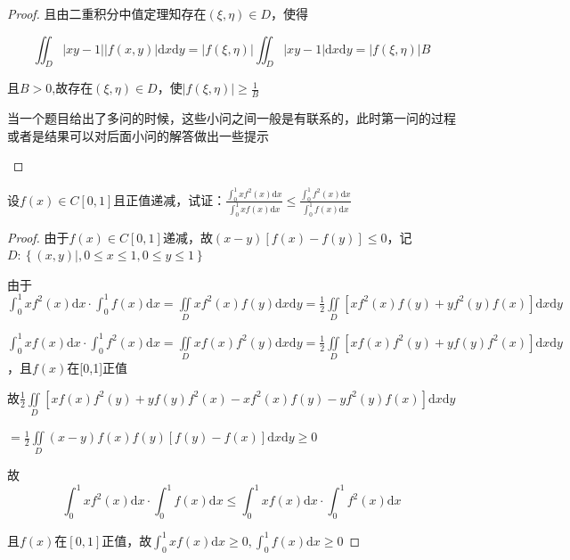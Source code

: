 \begin{xiti}
\begin{enumerate}
\begin{proof}
			且由二重积分中值定理知存在$(\xi, \eta) \in D$，使得
			
			\[ \iint_{D} |x y-1| |f(x, y)| \mathrm{d} x \mathrm{d} y = |f(\xi, \eta)| \iint_{D} |x y-1|  \mathrm{d} x \mathrm{d} y = |f(\xi, \eta)| B \]
			
			且$B>0$,故存在$(\xi, \eta) \in D$，使$|f(\xi, \eta)| \geqslant \frac{1}{B}$
			
			\begin{note}
				当一个题目给出了多问的时候，这些小问之间一般是有联系的，此时第一问的过程或者是结果可以对后面小问的解答做出一些提示
			\end{note}
		\end{proof}
		
	\end{enumerate}
	\item 设$f(x) \in C[0,1]$且正值递减，试证：$\frac{\int_{0}^{1} x f^{2}(x) \mathrm{d} x}{\int_{0}^{1} x f(x) \mathrm{d} x} \leqslant \frac{\int_{0}^{1} f^{2}(x) \mathrm{d} x}{\int_{0}^{1} f(x) \mathrm{d} x}$
	\begin{proof}
		由于$f(x) \in C[0,1]$递减，故$ (x-y)[f(x)-f(y)] \leqslant 0$，记$D:\left\{ (x, y) |, 0 \leqslant x \leqslant 1, 0 \leqslant y \leqslant 1 \right\}$
		
		由于
		$\int_{0}^{1} x f^{2}(x) \mathrm{d} x \cdot \int_{0}^{1} f(x) \mathrm{d} x = \iint\limits_{D}  x f^{2}(x) f(y) \mathrm{d} x \mathrm{d} y = \frac{1}{2} \iint\limits_{D} \left[ x f^{2}(x) f(y) + y f^{2}(y) f(x) \right] \mathrm{d} x \mathrm{d} y$
		
		$\int_{0}^{1} x f(x) \mathrm{d} x \cdot \int_{0}^{1} f^{2}(x) \mathrm{d} x =  \iint\limits_{D}  x f(x) f^{2}(y) \mathrm{d} x \mathrm{d} y = \frac{1}{2} \iint\limits_{D} \left[ x f(x) f^{2}(y) + y f(y) f^{2}(x) \right] \mathrm{d} x \mathrm{d} y$，且$f(x)$在[0,1]正值
		
		故$ \frac{1}{2} \iint\limits_{D} \left[ x f(x) f^{2}(y) + y f(y) f^{2}(x) - x f^{2}(x) f(y) - y f^{2}(y) f(x) \right] \mathrm{d} x \mathrm{d} y$
		
		$=\frac{1}{2} \iint\limits_{D} ( x - y ) f(x) f(y) [ f(y) - f(x)]  \mathrm{d} x \mathrm{d} y \geqslant 0$
		
		故\[\int_{0}^{1} x f^{2}(x) \mathrm{d} x \cdot \int_{0}^{1} f(x) \mathrm{d} x \leqslant \int_{0}^{1} x f(x) \mathrm{d} x \cdot \int_{0}^{1} f^{2}(x) \mathrm{d} x\]
		
		且$f(x)$在$[0,1]$正值，故$\int_{0}^{1} x f(x) \mathrm{d} x \geqslant 0 , \int_{0}^{1} f(x) \mathrm{d} x \geqslant 0$
		

\end{proof}
\end{xiti}
